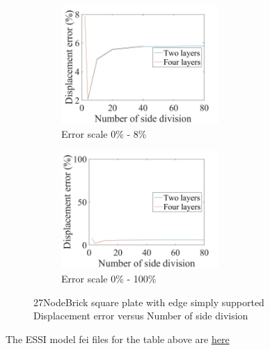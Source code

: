 \documentclass[fleqn,11pt]{article}
\begin{document}
\begin{figure}[H]
  \begin{subfigure}{0.5\textwidth}
    \centering
    \includegraphics[width=6cm]{../Figure-files/error27brick_square_plate_simply_supported.jpeg}
    \caption{Error scale 0\% - 8\%}
  \end{subfigure}
  \begin{subfigure}{0.5\textwidth}
    \centering
    \includegraphics[width=6cm]{../Figure-files/error27brick_square_plate_simply_supported100.jpeg}
    \caption{Error scale 0\% - 100\%}
  \end{subfigure}
  \captionsetup{justification=centering,margin=3cm}
  \caption{27NodeBrick square plate with edge simply supported\\
      Displacement error   versus   Number of side division}
  \label{fig 27NodeBrick square plate with four edge simply supported}
\end{figure}





The ESSI model fei files for the table above are \href{https://github.com/yuan-energy/ESSI_Verification/blob/master/27NodeBrick/square_plate_simply_support/square_plate_simply_support.tar.gz?raw=true}{here}
\end{document}
